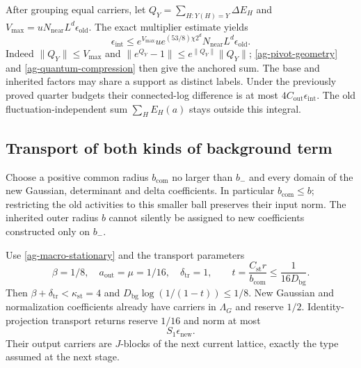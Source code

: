 After grouping equal carriers, let
$Q_Y=\sum_{H:Y(H)=Y}\Delta E_H$ and
$V_{\max}=uN_{\mathrm{near}}L^d\epsilon_{\mathrm{old}}$.
The exact multiplier estimate yields
\begin{equation}\label{ag-inherited-multiplier}
 \epsilon_{\mathrm{int}}
 \le e^{V_{\max}}u e^{(53/8)\chi2^d}
             N_{\mathrm{near}}L^d\epsilon_{\mathrm{old}}.
\end{equation}
Indeed $\|Q_Y\|\le V_{\max}$ and
$\|e^{Q_Y}-1\|\le e^{\|Q_Y\|}\|Q_Y\|$;
\eqref{ag-pivot-geometry} and
\eqref{ag-quantum-compression} then give the anchored sum.
The base and inherited factors may share a support as
distinct labels. Under the previously proved quarter
budgets their connected-log difference is at most
$4C_{\mathrm{out}}\epsilon_{\mathrm{int}}$.
The old fluctuation-independent sum $\sum_HE_H(a)$ stays
outside this integral.

\subsection{Transport of both kinds of background term}

Choose a positive common radius $b_{\mathrm{com}}$ no
larger than $b_-$ and every domain of the new Gaussian,
determinant and delta coefficients. In particular
$b_{\mathrm{com}}\le b$; restricting the old activities to
this smaller ball preserves their input norm. The inherited
outer radius $b$ cannot silently be assigned to new
coefficients constructed only on $b_-$.

Use \eqref{ag-macro-stationary} and the transport parameters
\begin{equation}\label{ag-transport-budget}
 \beta=1/8,\quad a_{\mathrm{out}}=\mu=1/16,\quad
 \delta_{\mathrm{tr}}=1,\qquad
 t=\frac{C_{\mathrm{st}}r}{b_{\mathrm{com}}}
                      \le\frac1{16D_{\mathrm{bg}}}.
\end{equation}
Then $\beta+\delta_{\mathrm{tr}}<\kappa_{\mathrm{st}}=4$
and $D_{\mathrm{bg}}\log(1/(1-t))\le1/8$.
New Gaussian and normalization coefficients already have
carriers in $\Lambda_G$ and reserve $1/2$. Identity-projection
transport returns reserve $1/16$ and norm at most
\begin{equation}\label{ag-new-transport}
 S_1\epsilon_{\mathrm{new}}.
\end{equation}
Their output carriers are $J$-blocks of the next current
lattice, exactly the type assumed at the next stage.

